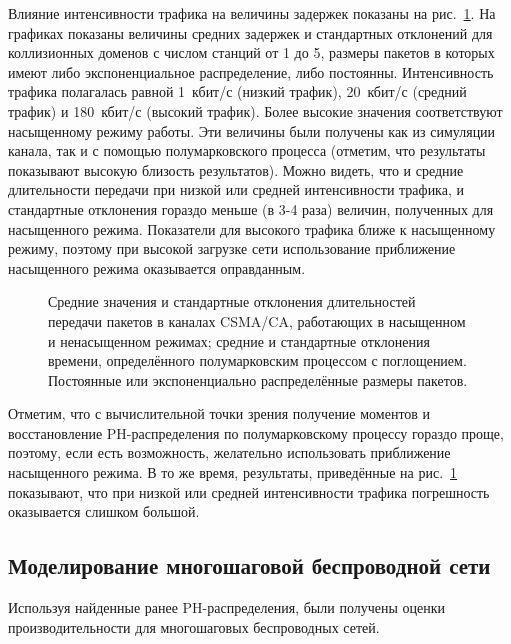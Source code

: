 Влияние интенсивности трафика на величины задержек показаны на рис.~\ref{fig:ch4_fitting_dcf_means}. На графиках показаны величины средних задержек и стандартных отклонений для коллизионных доменов с числом станций от 1 до 5, размеры пакетов в которых имеют либо экспоненциальное распределение, либо постоянны. Интенсивность трафика полагалась равной 1~кбит/с (низкий трафик), 20~кбит/с (средний трафик) и 180~кбит/с (высокий трафик). Более высокие значения соответствуют насыщенному режиму работы. Эти величины были получены как из симуляции канала, так и с помощью полумарковского процесса (отметим, что результаты показывают высокую близость результатов). Можно видеть, что и средние длительности передачи при низкой или средней интенсивности трафика, и стандартные отклонения гораздо меньше (в 3-4 раза) величин, полученных для насыщенного режима. Показатели для высокого трафика ближе к насыщенному режиму, поэтому при высокой загрузке сети использование приближение насыщенного режима оказывается оправданным.

\begin{figure}[h]
  \caption{Средние значения и стандартные отклонения длительностей передачи пакетов в каналах CSMA/CA, работающих в насыщенном и ненасыщенном режимах; средние и стандартные отклонения времени, определённого полумарковским процессом с поглощением. Постоянные или экспоненциально распределённые размеры пакетов.}
  \label{fig:ch4_fitting_dcf_means}
\end{figure}

Отметим, что с вычислительной точки зрения получение моментов и восстановление PH-распределения по полумарковскому процессу гораздо проще, поэтому, если есть возможность, желательно использовать приближение насыщенного режима. В то же время, результаты, приведённые на рис.~\ref{fig:ch4_fitting_dcf_means} показывают, что при низкой или средней интенсивности трафика погрешность оказывается слишком большой.




\subsection{Моделирование многошаговой беспроводной сети}
Используя найденные ранее PH-распределения, были получены оценки производительности для многошаговых беспроводных сетей.

